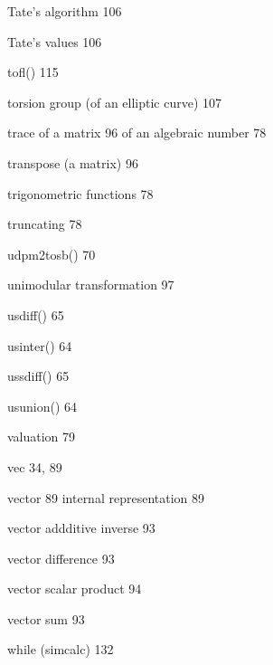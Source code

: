 \begin{theindex}
\indexspace

\item Tate's algorithm 106
\item Tate's values 106
\item tofl() 115
\item torsion group (of an elliptic curve) 107
\item trace 
  \subitem of a matrix 96
  \subitem of an algebraic number 78
\item transpose (a matrix) 96
\item trigonometric functions 78
\item truncating 78

\indexspace

\item udpm2tosb() 70
\item unimodular transformation 97
\item usdiff() 65
\item usinter() 64
\item ussdiff() 65
\item usunion() 64

\indexspace

\item valuation 79
\item vec 34, 89
\item vector 89
  \subitem internal representation 89
\item vector addditive inverse 93
\item vector difference 93
\item vector scalar product 94
\item vector sum 93

\indexspace

\item while (simcalc) 132

\end{theindex}






